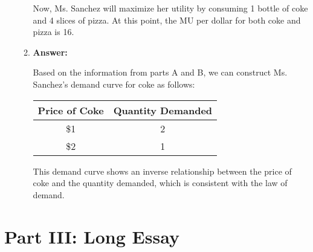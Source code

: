 \documentclass{article}
\begin{document}
\begin{enumerate}
\begin{enumerate}
                    Now, Ms. Sanchez will maximize her utility by consuming 1 bottle of coke and 4 slices of pizza. At this point, the MU per dollar for both coke and pizza is 16.

              \item \textbf{Answer:}

                    Based on the information from parts A and B, we can construct Ms. Sanchez's demand curve for coke as follows:

                    \begin{center}
                        \begin{tabular}{|c|c|}
                            \hline
                            Price of Coke & Quantity Demanded \\
                            \hline
                            \$1           & 2                 \\
                            \$2           & 1                 \\
                            \hline
                        \end{tabular}
                    \end{center}

                    This demand curve shows an inverse relationship between the price of coke and the quantity demanded, which is consistent with the law of demand.
          \end{enumerate}
\end{enumerate}

\section*{Part III: Long Essay}
\end{document}

